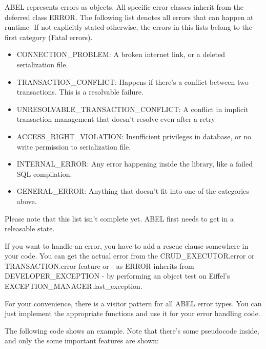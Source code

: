 ABEL represents errors as objects. 
All specific error classes inherit from the deferred class ERROR.
The following list denotes all errors that can happen at runtime- 
If not explicitly stated otherwise, the errors in this lists belong to the first category (Fatal errors).

\begin{itemize}
\item CONNECTION\_PROBLEM: A broken internet link, or a deleted serialization file.
\item TRANSACTION\_CONFLICT: Happens if there's a conflict between two transactions. This is a resolvable failure.
\item UNRESOLVABLE\_TRANSACTION\_CONFLICT: A conflict in implicit transaction management that doesn't resolve even after a retry
\item ACCESS\_RIGHT\_VIOLATION: Insufficient privileges in database, or no write permission to serialization file.
\item INTERNAL\_ERROR: Any error happening inside the library, like a failed SQL compilation.
\item GENERAL\_ERROR: Anything that doesn't fit into one of the categories above.
\end{itemize}

Please note that this list isn't complete yet. ABEL first needs to get in a releasable state.

If you want to handle an error, you have to add a rescue clause somewhere in your code. 
You can get the actual error from the CRUD\_EXECU\-TOR.error or TRANSACTION.error feature or - as ERROR inherits from DEVELOPER\_EXCEPTION -
by performing an object test on Eiffel's EXCEPTION\_MANAGER.last\_exception.

For your convenience, there is a visitor pattern for all ABEL error types. 
You can just implement the appropriate functions and use it for your error handling code.

The following code shows an example. 
Note that there's some pseudocode inside, and only the some important features are shown:


